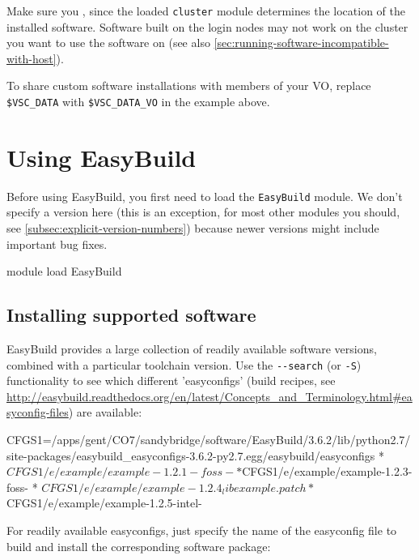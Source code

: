 Make sure you , since the loaded \lstinline|cluster|
module determines the location of the installed software. Software built on the login
nodes may not work on the cluster you want to use the software on (see also \autoref{sec:running-software-incompatible-with-host}).

To share custom software installations with members of your VO, replace \lstinline|$VSC_DATA|
with \lstinline|$VSC_DATA_VO| in the example above.

\section{Using EasyBuild}

Before using EasyBuild, you first need to load the \lstinline|EasyBuild| module. We don't specify
a version here (this is an exception, for most other modules you should, see \autoref{subsec:explicit-version-numbers}) because newer versions
might include important bug fixes.

\begin{prompt}
module load EasyBuild
\end{prompt}

\subsection{Installing supported software}

EasyBuild provides a large collection of readily available software versions,
combined with a particular toolchain version. Use the \lstinline|--search|
(or \lstinline|-S|) functionality to see which different 'easyconfigs'
(build recipes, see \url{http://easybuild.readthedocs.org/en/latest/Concepts_and_Terminology.html#easyconfig-files}) are available:

\begin{prompt}
CFGS1=/apps/gent/CO7/sandybridge/software/EasyBuild/3.6.2/lib/python2.7/site-packages/easybuild_easyconfigs-3.6.2-py2.7.egg/easybuild/easyconfigs
 * $CFGS1/e/example/example-1.2.1-foss-%
 * $CFGS1/e/example/example-1.2.3-foss-%
 * $CFGS1/e/example/example-1.2.4_libexample.patch
 * $CFGS1/e/example/example-1.2.5-intel-%
\end{prompt}

For readily available easyconfigs, just specify the name of the easyconfig file to build
and install the corresponding software package:

